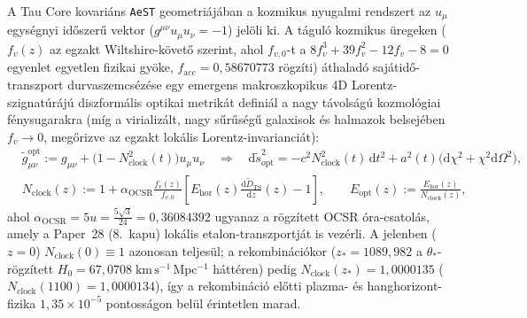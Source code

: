 \documentclass[11pt,a4paper]{article}
\begin{document}
A Tau Core kovariáns \texttt{AeST} geometriájában a kozmikus nyugalmi rendszert az $u_\mu$ egységnyi időszerű vektor ($g^{\mu\nu}u_\mu u_\nu = -1$) jelöli ki. A táguló kozmikus üregeken ($f_v(z)$ az egzakt Wiltshire-követő szerint, ahol $f_{v,0}$-t a $8f_v^3 + 39f_v^2 - 12f_v - 8 = 0$ egyenlet egyetlen fizikai gyöke, $f_{\mathrm{acc}} = 0{,}58670773$ rögzíti) áthaladó sajátidő-transzport durvaszemcsézése egy emergens makroszkopikus 4D Lorentz-szignatúrájú diszformális optikai metrikát definiál a nagy távolságú kozmológiai fénysugarakra (míg a virializált, nagy sűrűségű galaxisok és halmazok belsejében $f_v \to 0$, megőrizve az egzakt lokális Lorentz-invarianciát):
\begin{equation}
\begin{aligned}
    &\tilde{g}_{\mu\nu}^{\mathrm{opt}} := g_{\mu\nu} + \bigl(1 - N_{\mathrm{clock}}^2(t)\bigr)u_\mu u_\nu \quad\Longrightarrow\quad \mathrm{d}\tilde{s}_{\mathrm{opt}}^2 = -c^2 N_{\mathrm{clock}}^2(t)\,\mathrm{d}t^2 + a^2(t)\bigl(\mathrm{d}\chi^2 + \chi^2\mathrm{d}\Omega^2\bigr), \\
    &N_{\mathrm{clock}}(z) := 1 + \alpha_{\mathrm{OCSR}}\frac{f_v(z)}{f_{v,0}}\!\left[E_{\mathrm{hor}}(z)\frac{\mathrm{d}\widetilde{D}_{\mathrm{TS}}}{\mathrm{d}z}(z) - 1\right], \qquad E_{\mathrm{opt}}(z) := \frac{E_{\mathrm{hor}}(z)}{N_{\mathrm{clock}}(z)},
\end{aligned}
\label{eq:disformal-metric-hu}
\end{equation}
ahol $\alpha_{\mathrm{OCSR}} = 5u = \frac{5\sqrt{3}}{24} = 0{,}36084392$ ugyanaz a rögzített OCSR óra-csatolás, amely a Paper~28 (8.~kapu) lokális etalon-transzportját is vezérli. A jelenben ($z = 0$) $N_{\mathrm{clock}}(0) \equiv 1$ azonosan teljesül; a rekombinációkor ($z_* = 1089{,}982$ a $\theta_*$-rögzített $H_0 = 67{,}0708\;\mathrm{km\,s^{-1}\,Mpc^{-1}}$ háttéren) pedig $N_{\mathrm{clock}}(z_*) = 1{,}0000135$ ($N_{\mathrm{clock}}(1100) = 1{,}0000134$), így a rekombináció előtti plazma- és hanghorizont-fizika $1{,}35\times 10^{-5}$ pontosságon belül érintetlen marad.
\end{document}
